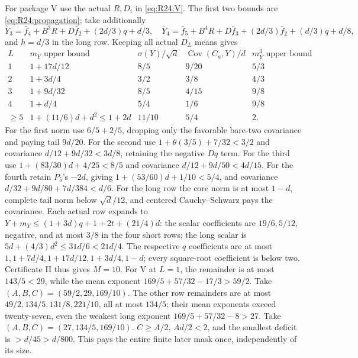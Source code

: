 For package V use the actual $R,D_i$ in \eqref{eq:R24:V}.
The first two bounds are \eqref{eq:R24:propagation}; take additionally
\[
\overline Y_3=\bar f_4+B^3R+D\bar f_2+(2d/3)q+d/3,
\quad
\overline Y_4=\bar f_5+B^4R+D\bar f_3+(2d/3)\bar f_2+(d/3)q+d/8,
\]
and $h=d/3$ in the long row. Keeping all actual $D_L$ means gives
\begin{equation}\tag{R24.9.table}\label{eq:R24:Vtable}
\begin{array}{c|c|c|c|c}
L&m_Y\text{ upper bound}&\sigma(Y)/\sqrt d
&\operatorname{Cov}(C_a,Y)/d&m_Y^3\text{ upper bound}\\\hline
1&1+17d/12&8/5&9/20&5/3\\
2&1+3d/4&3/2&3/8&4/3\\
3&1+9d/32&8/5&4/15&9/8\\
4&1+d/4&5/4&1/6&9/8\\
\ge5&1+(11/6)d+d^2\le1+2d&11/10&5/4&2.
\end{array}
\end{equation}
For the first norm use $6/5+2/5$, dropping only the favorable
bare-two covariance and paying tail $9d/20$.
For the second use $1+\theta(3/5)+7/32<3/2$ and covariance
$d/12+9d/32<3d/8$, retaining the negative $Dq$ term.
For the third use $1+(83/30)d+4/25<8/5$ and covariance
$d/12+9d/50<4d/15$.
For the fourth retain $P_5$'s $-2d$, giving
$1+(53/60)d+1/10<5/4$, and covariance
$d/32+9d/80+7d/384<d/6$.
For the long row the core norm is at most $1-d$, complete tail norm
below $\sqrt d/12$, and centered Cauchy--Schwarz pays the covariance.
Each actual row expands to
$Y+m_Y\le(1+3d)q+1+2t+(21/4)d$:
the scalar coefficients are $19/6,5/12$, negative, and at most $3/8$
in the four short rows; the long scalar is
$5d+(4/3)d^2\le31d/6<21d/4$.
The respective $q$ coefficients are at most
$1,1+7d/4,1+17d/12,1+3d/4,1-d$; every square-root coefficient is
below two. Certificate II thus gives $M=10$.
For V at $L=1$, the remainder is at most $143/5<29$, while the
mean exponent $169/5+57/32-17/3>59/2$.
Take $(A,B,C)=(59/2,29,169/10)$.
The other row remainders are at most $49/2,134/5,131/8,221/10$,
all at most $134/5$; their mean exponents exceed twenty-seven, even
the weakest long exponent $169/5+57/32-8>27$.
Take $(A,B,C)=(27,134/5,169/10)$.
$C\ge A/2$, $Ad/2<2$, and the smallest deficit is $>d/45>d/800$.
This pays the entire finite later mask once, independently of its size.

